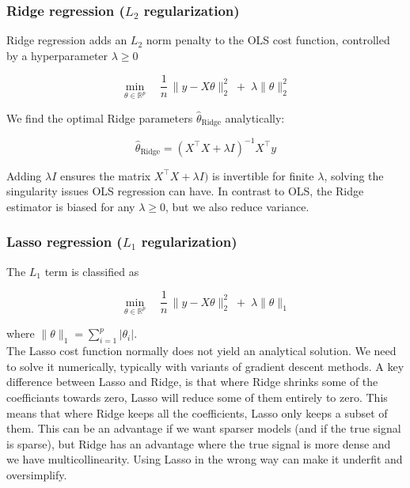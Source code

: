 \documentclass[amssymb,twocolumn,aps]{revtex4-2}
\begin{document}
\subsubsection{Ridge regression ($L_2$ regularization)} 

Ridge regression adds an $L_2$ norm penalty to the OLS cost function, controlled by a hyperparameter $\lambda \ge 0$

\begin{equation}
\min_{\theta \in \mathbb{R}^p}
\quad
\frac{1}{n}\,\lVert y - X\theta \rVert_2^2
\;+\;
\lambda \lVert \theta \rVert_2^2
\end{equation}

We find the optimal Ridge parameters $\hat{\theta}_{\text{Ridge}}$ analytically: 

\begin{equation}
    \hat{\theta}_{\text{Ridge}}
= (X^\top X + \lambda I)^{-1} X^\top y
\end{equation}

Adding $\lambda I$ ensures the matrix $X^\top X + \lambda I)$ is invertible for finite $\lambda$, solving the singularity issues OLS regression can have. In contrast to OLS, the Ridge estimator is biased for any $\lambda \ge 0$, but we also reduce variance. \\

\subsubsection{Lasso regression ($L_1$ regularization)}

The $L_1$ term is classified as 

\begin{equation}
\min_{\theta \in \mathbb{R}^p}
\quad
\frac{1}{n}\,\lVert y - X\theta \rVert_2^2
\;+\;
\lambda \lVert \theta \rVert_1
\end{equation}

where $\lVert \theta \rVert_1 = \sum_{i=1}^p \lvert \theta_i \rvert$. \\

The Lasso cost function normally does not yield an analytical solution. We need to solve it numerically, typically with variants of gradient descent methods. A key difference between Lasso and Ridge, is that where Ridge shrinks some of the coefficiants towards zero, Lasso will reduce some of them entirely to zero. This means that where Ridge keeps all the coefficients, Lasso only keeps a subset of them. This can be an advantage if we want sparser models (and if the true signal is sparse), but Ridge has an advantage where the true signal is more dense and we have multicollinearity. Using Lasso in the wrong way can make it underfit and oversimplify. 
\end{document}

